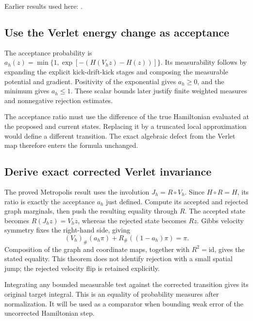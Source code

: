 \documentclass[11pt,a4paper]{report}
\begin{document}
Earlier results used here: \cite[Section~3.35.7]{LangevinLean2026ULASC}.
\subsection{\texorpdfstring{Use the Verlet energy change as acceptance}{Use the Verlet energy change as acceptance}}
\label{report-step-KineticLangevin-HamiltonianWeak-lean-3}


The acceptance probability is \(a_h(z)=\min\{1,\exp[-(H(V_hz)-H(z))]\}\). Its measurability follows by expanding the explicit kick-drift-kick stages and composing the measurable potential and gradient. Positivity of the exponential gives \(a_h\ge0\), and the minimum gives \(a_h\le1\). These scalar bounds later justify finite weighted measures and nonnegative rejection estimates.



The acceptance ratio must use the difference of the true Hamiltonian evaluated at the proposed and current states. Replacing it by a truncated local approximation would define a different transition. The exact algebraic defect from the Verlet map therefore enters the formula unchanged.

\subsection{\texorpdfstring{Derive exact corrected Verlet invariance}{Derive exact corrected Verlet invariance}}
\label{report-step-KineticLangevin-HamiltonianWeak-lean-4}


The proved Metropolis result uses the involution \(J_h=R\circ V_h\). Since \(H\circ R=H\), its ratio is exactly the acceptance \(a_h\) just defined. Compute its accepted and rejected graph marginals, then push the resulting equality through \(R\). The accepted state becomes \(R(J_hz)=V_hz\), whereas the rejected state becomes \(Rz\). Gibbs velocity symmetry fixes the right-hand side, giving \[(V_h)_\#(a_h\pi)+R_\#((1-a_h)\pi)=\pi.\] Composition of the graph and coordinate maps, together with \(R^2=\mathrm{id}\), gives the stated equality. This theorem does not identify rejection with a small spatial jump; the rejected velocity flip is retained explicitly.



Integrating any bounded measurable test against the corrected transition gives its original target integral. This is an equality of probability measures after normalization. It will be used as a comparator when bounding weak error of the uncorrected Hamiltonian step.
\end{document}

